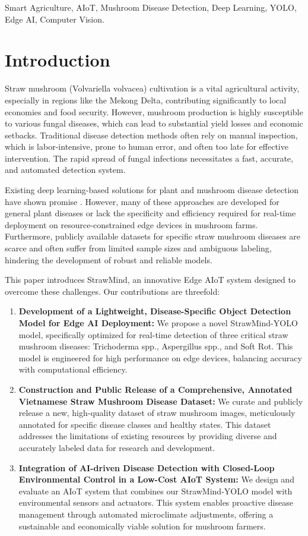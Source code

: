 \documentclass[journal]{IEEEtran}
\begin{document}
\begin{IEEEkeywords}
Smart Agriculture, AIoT, Mushroom Disease Detection, Deep Learning, YOLO, Edge AI, Computer Vision.
\end{IEEEkeywords}


\section{Introduction}
Straw mushroom (Volvariella volvacea) cultivation is a vital agricultural activity, especially in regions like the Mekong Delta, contributing significantly to local economies and food security. However, mushroom production is highly susceptible to various fungal diseases, which can lead to substantial yield losses and economic setbacks. Traditional disease detection methods often rely on manual inspection, which is labor-intensive, prone to human error, and often too late for effective intervention. The rapid spread of fungal infections necessitates a fast, accurate, and automated detection system.

Existing deep learning-based solutions for plant and mushroom disease detection have shown promise \cite{choi2026comparative, dika2026fungal}. However, many of these approaches are developed for general plant diseases or lack the specificity and efficiency required for real-time deployment on resource-constrained edge devices in mushroom farms. Furthermore, publicly available datasets for specific straw mushroom diseases are scarce and often suffer from limited sample sizes and ambiguous labeling, hindering the development of robust and reliable models.

This paper introduces StrawMind, an innovative Edge AIoT system designed to overcome these challenges. Our contributions are threefold:
\begin{enumerate}
    \item \textbf{Development of a Lightweight, Disease-Specific Object Detection Model for Edge AI Deployment:} We propose a novel StrawMind-YOLO model, specifically optimized for real-time detection of three critical straw mushroom diseases: Trichoderma spp., Aspergillus spp., and Soft Rot. This model is engineered for high performance on edge devices, balancing accuracy with computational efficiency.
    \item \textbf{Construction and Public Release of a Comprehensive, Annotated Vietnamese Straw Mushroom Disease Dataset:} We curate and publicly release a new, high-quality dataset of straw mushroom images, meticulously annotated for specific disease classes and healthy states. This dataset addresses the limitations of existing resources by providing diverse and accurately labeled data for research and development.
    \item \textbf{Integration of AI-driven Disease Detection with Closed-Loop Environmental Control in a Low-Cost AIoT System:} We design and evaluate an AIoT system that combines our StrawMind-YOLO model with environmental sensors and actuators. This system enables proactive disease management through automated microclimate adjustments, offering a sustainable and economically viable solution for mushroom farmers.
\end{enumerate}
\end{document}
